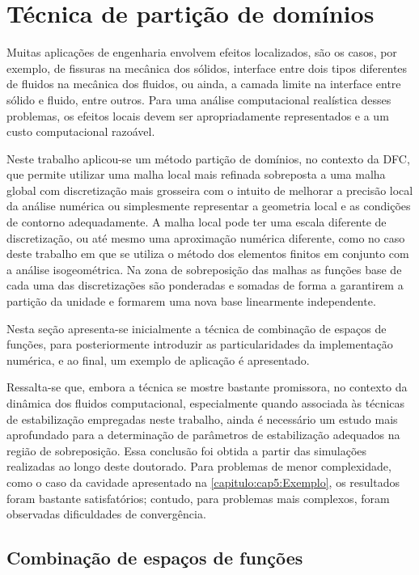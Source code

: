 \chapter[Técnica de partição de domínios]{Técnica de partição de domínios} \label{capitulo:Cap5}

Muitas aplicações de engenharia envolvem efeitos localizados, são os casos, por exemplo, de fissuras na mecânica dos sólidos, interface entre dois tipos diferentes de fluidos na mecânica dos fluidos, ou ainda, a camada limite na interface entre sólido e fluido, entre outros. Para uma análise computacional realística desses problemas, os efeitos locais devem ser apropriadamente representados e a um custo computacional razoável. 

Neste trabalho aplicou-se um método partição de domínios, no contexto da DFC, que permite utilizar uma malha local mais refinada sobreposta a uma malha global com discretização mais grosseira com o intuito de melhorar a precisão local da análise numérica ou simplesmente representar a geometria local e as condições de contorno adequadamente. A malha local pode ter uma escala diferente de discretização, ou até mesmo uma aproximação numérica diferente, como no caso deste trabalho em que se utiliza o método dos elementos finitos em conjunto com a análise isogeométrica. Na zona de sobreposição das malhas as funções base de cada uma das discretizações são ponderadas e somadas de forma a garantirem a partição da unidade e formarem uma nova base linearmente independente.

Nesta seção apresenta-se inicialmente a técnica de combinação de espaços de funções, para posteriormente introduzir as particularidades da implementação numérica, e ao final, um exemplo de aplicação é apresentado.

Ressalta-se que, embora a técnica se mostre bastante promissora, no contexto da dinâmica dos fluidos computacional, especialmente quando associada às técnicas de estabilização empregadas neste trabalho, ainda é necessário um estudo mais aprofundado para a determinação de parâmetros de estabilização adequados na região de sobreposição. Essa conclusão foi obtida a partir das simulações realizadas ao longo deste doutorado. Para problemas de menor complexidade, como o caso da cavidade apresentado na \autoref{capitulo:cap5:Exemplo}, os resultados foram bastante satisfatórios; contudo, para problemas mais complexos, foram observadas dificuldades de convergência.

\section{Combinação de espaços de funções}

